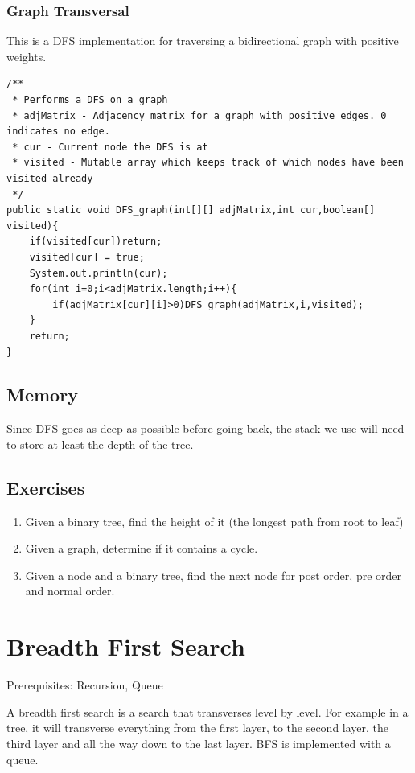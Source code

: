 \documentclass[11pt,oneside]{book}
\begin{document}
\subsubsection{Graph Transversal}

This is a DFS implementation for traversing a bidirectional graph with positive weights.

\begin{lstlisting}
/**
 * Performs a DFS on a graph
 * adjMatrix - Adjacency matrix for a graph with positive edges. 0 indicates no edge.
 * cur - Current node the DFS is at
 * visited - Mutable array which keeps track of which nodes have been visited already
 */
public static void DFS_graph(int[][] adjMatrix,int cur,boolean[] visited){
    if(visited[cur])return;
    visited[cur] = true;
    System.out.println(cur);
    for(int i=0;i<adjMatrix.length;i++){
        if(adjMatrix[cur][i]>0)DFS_graph(adjMatrix,i,visited);
    }
    return;
}

\end{lstlisting}

\subsection{Memory}

Since DFS goes as deep as possible before going back, the stack we use will need to store at least the depth of the tree.

\subsection{Exercises}

\begin{enumerate}
\item Given a binary tree, find the height of it (the longest path from root to leaf)
\item Given a graph, determine if it contains a cycle.
\item Given a node and a binary tree, find the next node for post order, pre order and normal order.
\end{enumerate}

        \section{ Breadth First Search }
        

Prerequisites: Recursion, Queue

A breadth first search is a search that transverses level by level. For example in a tree, it will transverse everything from the first layer, to the second layer, the third layer and all the way down to the last layer. BFS is implemented with a queue.
\end{document}
